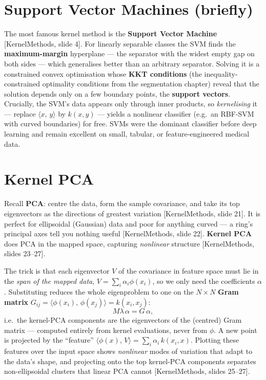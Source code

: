 \documentclass[11pt]{article}
\newcommand{\inner}[2]{\langle #1,\,#2\rangle}
\newcommand{\deck}[1]{\textsf{\small[#1]}}
\begin{document}
\section{Support Vector Machines (briefly)}

The most famous kernel method is the \textbf{Support Vector Machine}
\deck{KernelMethods, slide 4}. For linearly separable classes the SVM finds the
\textbf{maximum-margin} hyperplane --- the separator with the widest empty gap on
both sides --- which generalises better than an arbitrary separator. Solving it is
a constrained convex optimisation whose \textbf{KKT conditions} (the
inequality-constrained optimality conditions from the segmentation chapter)
reveal that the solution depends only on a few boundary points, the
\textbf{support vectors}. Crucially, the SVM's data appears only through inner
products, so \emph{kernelising} it --- replace $\inner{x}{y}$ by $k(x,y)$ --- yields
a nonlinear classifier (e.g.\ an RBF-SVM with curved boundaries) for free. SVMs
were the dominant classifier before deep learning and remain excellent on small,
tabular, or feature-engineered medical data.

\section{Kernel PCA}

Recall \textbf{PCA}: centre the data, form the sample covariance, and take its
top eigenvectors as the directions of greatest variation \deck{KernelMethods,
slide 21}. It is perfect for ellipsoidal (Gaussian) data and poor for anything
curved --- a ring's principal axes tell you nothing useful \deck{KernelMethods,
slide 22}. \textbf{Kernel PCA} does PCA in the mapped space, capturing
\emph{nonlinear} structure \deck{KernelMethods, slides 23--27}.

The trick is that each eigenvector $V$ of the covariance in feature space must lie
in the \emph{span of the mapped data}, $V=\sum_i \alpha_i\phi(x_i)$, so we only
need the coefficients $\alpha$. Substituting reduces the whole eigenproblem to one
on the $N\times N$ \textbf{Gram matrix} $G_{ij}=\inner{\phi(x_i)}{\phi(x_j)}=k(x_i,x_j)$:
\[
M\lambda\,\alpha = G\,\alpha,
\]
i.e.\ the kernel-PCA components are the eigenvectors of the (centred) Gram matrix
--- computed entirely from kernel evaluations, never from $\phi$. A new point is
projected by the ``feature'' $\inner{\phi(x)}{V}=\sum_i\alpha_i\,k(x_i,x)$. Plotting
these features over the input space shows \emph{nonlinear} modes of variation that
adapt to the data's shape, and projecting onto the top kernel-PCA components
separates non-ellipsoidal clusters that linear PCA cannot \deck{KernelMethods,
slides 25--27}.
\end{document}
